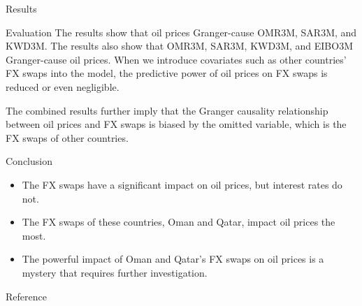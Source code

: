 \documentclass{beamer}
\begin{document}
\begin{frame}{Results}
    \begin{table}
        \centering
        \caption{Granger Causality Test Results}
        \label{table4}
    \end{table}
\end{frame}

\begin{frame}{Evaluation}
\indent The results show that oil prices Granger-cause OMR3M, SAR3M, and KWD3M. The results also show that OMR3M, SAR3M, KWD3M, and EIBO3M Granger-cause oil prices. When we introduce covariates such as other countries' FX swaps into the model, the predictive power of oil prices on FX swaps is reduced or even negligible.

\indent The combined results further imply that the Granger causality relationship between oil prices and FX swaps is biased by the omitted variable, which is the FX swaps of other countries.
\end{frame}

\begin{frame}{Conclusion}
    \begin{itemize}
        \item The FX swaps have a significant impact on oil prices, but interest rates do not.
        \item The FX swaps of these countries, Oman and Qatar, impact oil prices the most.
        \item The powerful impact of Oman and Qatar's FX swaps on oil prices is a mystery that requires further investigation.
    \end{itemize}
\end{frame}


\begin{frame}{Reference}
\printbibliography
\end{frame}
\end{document}
